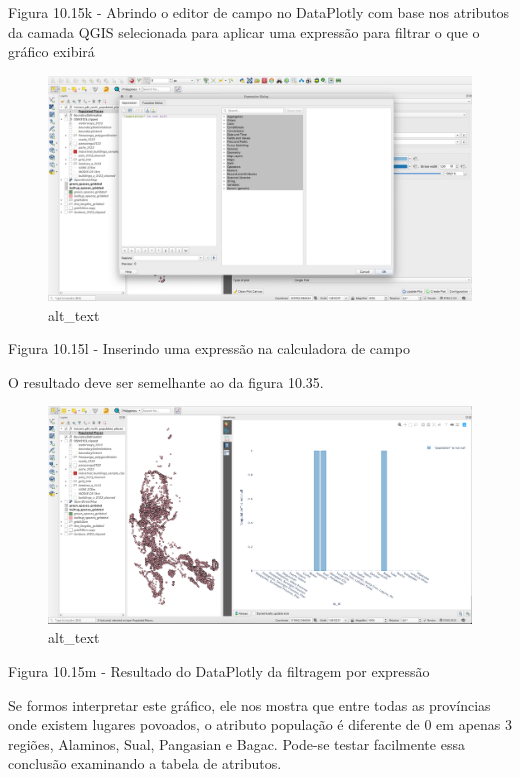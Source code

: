 \documentclass[
]{book}
\begin{document}
Figura 10.15k - Abrindo o editor de campo no DataPlotly com base nos atributos da camada QGIS selecionada para aplicar uma expressão para filtrar o que o gráfico exibirá

\begin{figure}
\centering
\includegraphics{media/modulo10/fig1015_l.png}
\caption{alt\_text}
\end{figure}

Figura 10.15l - Inserindo uma expressão na calculadora de campo

O resultado deve ser semelhante ao da figura 10.35.

\begin{figure}
\centering
\includegraphics{media/modulo10/fig1015_m.png}
\caption{alt\_text}
\end{figure}

Figura 10.15m - Resultado do DataPlotly da filtragem por expressão

Se formos interpretar este gráfico, ele nos mostra que entre todas as províncias onde existem lugares povoados, o atributo população é diferente de 0 em apenas 3 regiões, Alaminos, Sual, Pangasian e Bagac. Pode-se testar facilmente essa conclusão examinando a tabela de atributos.
\end{document}
